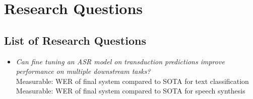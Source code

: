 \chapter{Research Questions} \label{chap:research-questions}

\section{List of Research Questions}

\begin{itemize}
    \item \textit{Can fine tuning an ASR model on transduction predictions
    improve performance on multiple downstream tasks?} \\
    Measurable: WER of final system compared to SOTA for text classification \\
    Measurable: WER of final system compared to SOTA for speech synthesis
\end{itemize}